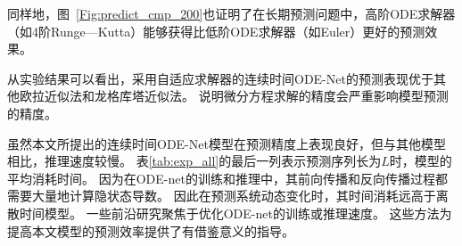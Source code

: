 同样地，图~\ref{Fig:predict_cmp_200}也证明了在长期预测问题中，高阶ODE求解器（如4阶Runge—Kutta）能够获得比低阶ODE求解器（如Euler）更好的预测效果。








从实验结果可以看出，采用自适应求解器的连续时间ODE-Net的预测表现优于其他欧拉近似法和龙格库塔近似法。
说明微分方程求解的精度会严重影响模型预测的精度。

虽然本文所提出的连续时间ODE-Net模型在预测精度上表现良好，但与其他模型相比，推理速度较慢。
表\ref{tab:exp_all}的最后一列表示预测序列长为$L$时，模型的平均消耗时间。
因为在ODE-net的训练和推理中，其前向传播和反向传播过程都需要大量地计算隐状态导数。
因此在预测系统动态变化时，其时间消耗远高于离散时间模型。
一些前沿研究\cite{J2020,poli2020,kelly2020}聚焦于优化ODE-net的训练或推理速度。
这些方法为提高本文模型的预测效率提供了有借鉴意义的指导。


